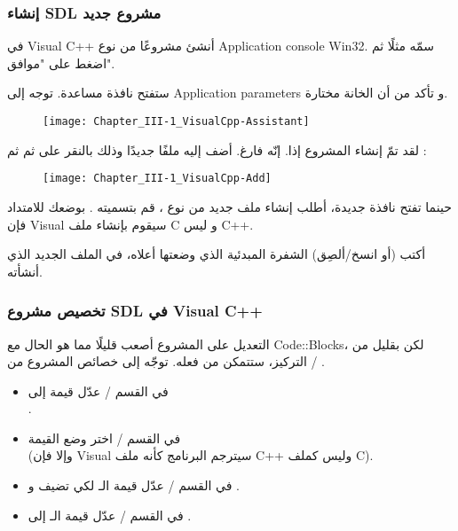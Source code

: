 \subsubsection{إنشاء \textenglish{SDL} مشروع جديد}

في \textenglish{Visual C++}
أنشئ مشروعًا من نوع 
\textenglish{Application console Win32}.
سمّه مثلًا
ثم اضغط على "موافق".

ستفتح نافذة مساعدة. توجه إلى 
\textenglish{Application parameters}
و تأكد من أن الخانة
مختارة.

\begin{figure}[H]
	\centering
	\texttt{[image: Chapter\_III-1\_VisualCpp-Assistant]}
\end{figure}

لقد تمّ إنشاء المشروع إذا. إنّه فارغ. أضف إليه ملفًا جديدًا وذلك بالنقر على
ثم
ثم
:

\begin{figure}[H]
	\centering
	\texttt{[image: Chapter\_III-1\_VisualCpp-Add]}
\end{figure}

حينما تفتح نافذة جديدة، أطلب إنشاء ملف جديد من نوع
،
قم بتسميته
.
بوضعك للامتداد
فإن \textenglish{Visual}
سيقوم بإنشاء ملف
\textenglish{C}
و ليس
\textenglish{C++}.

أكتب (أو انسخ/ألصِق) الشفرة المبدئية الذي وضعتها أعلاه، في الملف الجديد الذي أنشأته.

\subsubsection{تخصيص مشروع \textenglish{SDL} في \textenglish{Visual C++}}

التعديل على المشروع أصعب قليلًا مما هو الحال مع \textenglish{Code::Blocks}،
لكن بقليل من التركيز، ستتمكن من فعله. توجّه إلى خصائص المشروع من
 / .

\begin{itemize}
	\item في القسم
	 / 
	عدّل قيمة 
	إلى\\
	.
	\item في القسم 
	 / 
	اختر
	وضع القيمة\\
	(وإلا فإن
	\textenglish{Visual}
	سيترجم البرنامج كأنه ملف
	\textenglish{C++}
	وليس كملف
	\textenglish{C}).
	\item في القسم  
	 / 
	عدّل قيمة الـ
	لكي تضيف
	و
	.
	\item في القسم
	 / 
	عدّل قيمة الـ
	إلى .
\end{itemize}

